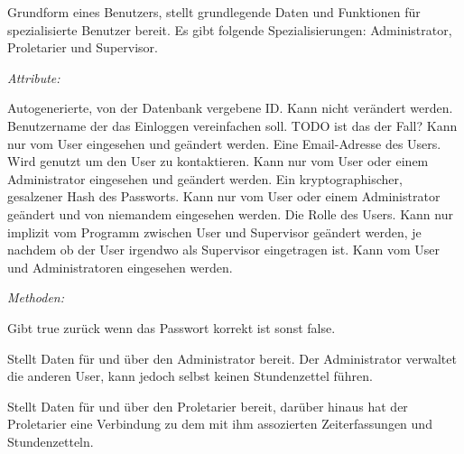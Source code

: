         \begin{itemize}
                Grundform eines Benutzers, stellt grundlegende Daten und Funktionen für spezialisierte Benutzer bereit.
                Es gibt folgende Spezialisierungen: Administrator, Proletarier und Supervisor.

                \emph{Attribute:}
                \begin{itemize}
                        Autogenerierte, von der Datenbank vergebene ID.
                        Kann nicht verändert werden.
                        Benutzername der das Einloggen vereinfachen soll. TODO ist das der Fall?
                        Kann nur vom User eingesehen und geändert werden.
                        Eine Email-Adresse des Users.
                        Wird genutzt um den User zu kontaktieren.
                        Kann nur vom User oder einem Administrator eingesehen und geändert werden.
                        Ein kryptographischer, gesalzener Hash des Passworts.
                        Kann nur vom User oder einem Administrator geändert und von niemandem eingesehen werden.
                        Die Rolle des Users.
                        Kann nur implizit vom Programm zwischen User und Supervisor geändert werden, je nachdem ob der User irgendwo als Supervisor eingetragen ist.
                        Kann vom User und Administratoren eingesehen werden.
                \end{itemize}
                \emph{Methoden:}
                \begin{itemize}
                        Gibt true zurück wenn das Passwort korrekt ist sonst false.
                \end{itemize}

                Stellt Daten für und über den Administrator bereit.
                Der Administrator verwaltet die anderen User, kann jedoch selbst keinen Stundenzettel führen.


                Stellt Daten für und über den Proletarier bereit, darüber hinaus hat der Proletarier eine Verbindung zu dem mit ihm assozierten Zeiterfassungen und Stundenzetteln.


\end{itemize}
